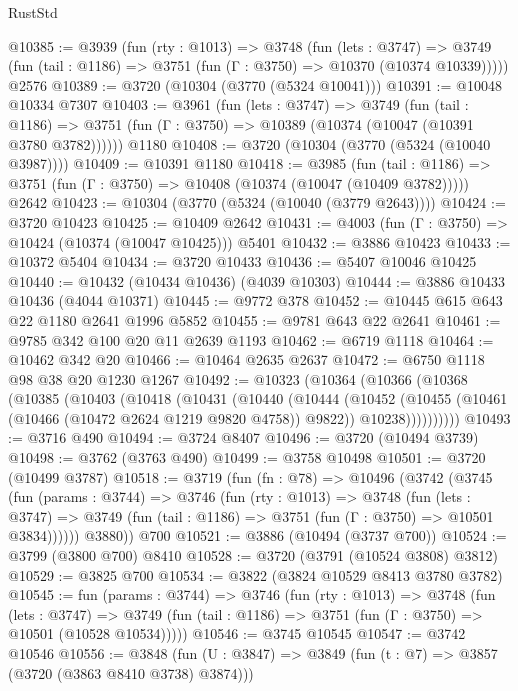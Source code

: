 \begin{lexlean}{RustStd}
\begin{coremodule}
@10385 := @3939
    (fun (rty : @1013) =>
    @3748
      (fun (lets : @3747) =>
      @3749 (fun (tail : @1186) => @3751 (fun (Γ : @3750) => @10370 (@10374 @10339)))))
    @2576
@10389 := @3720 (@10304 (@3770 (@5324 @10041)))
@10391 := @10048 @10334 @7307
@10403 := @3961
    (fun (lets : @3747) =>
    @3749
      (fun (tail : @1186) =>
      @3751 (fun (Γ : @3750) => @10389 (@10374 (@10047 (@10391 @3780 @3782))))))
    @1180
@10408 := @3720 (@10304 (@3770 (@5324 (@10040 @3987))))
@10409 := @10391 @1180
@10418 := @3985
    (fun (tail : @1186) => @3751 (fun (Γ : @3750) => @10408 (@10374 (@10047 (@10409 @3782)))))
    @2642
@10423 := @10304 (@3770 (@5324 (@10040 (@3779 @2643))))
@10424 := @3720 @10423
@10425 := @10409 @2642
@10431 := @4003 (fun (Γ : @3750) => @10424 (@10374 (@10047 @10425))) @5401
@10432 := @3886 @10423
@10433 := @10372 @5404
@10434 := @3720 @10433
@10436 := @5407 @10046 @10425
@10440 := @10432 (@10434 @10436) (@4039 @10303)
@10444 := @3886 @10433 @10436 (@4044 @10371)
@10445 := @9772 @378
@10452 := @10445 @615 @643 @22 @1180 @2641 @1996 @5852
@10455 := @9781 @643 @22 @2641
@10461 := @9785 @342 @100 @20 @11 @2639 @1193
@10462 := @6719 @1118
@10464 := @10462 @342 @20
@10466 := @10464 @2635 @2637
@10472 := @6750 @1118 @98 @38 @20 @1230 @1267
@10492 := @10323
    (@10364
      (@10366
        (@10368
          (@10385
            (@10403
              (@10418
                (@10431
                  (@10440
                    (@10444
                      (@10452
                        (@10455 (@10461 (@10466 (@10472 @2624 @1219 @9820 @4758)) @9822))
                        @10238))))))))))
@10493 := @3716 @490
@10494 := @3724 @8407
@10496 := @3720 (@10494 @3739)
@10498 := @3762 (@3763 @490)
@10499 := @3758 @10498
@10501 := @3720 (@10499 @3787)
@10518 := @3719
    (fun (fn : @78) =>
    @10496
      (@3742
        (@3745
          (fun (params : @3744) =>
          @3746
            (fun (rty : @1013) =>
            @3748
              (fun (lets : @3747) =>
              @3749 (fun (tail : @1186) => @3751 (fun (Γ : @3750) => @10501 @3834))))))
        @3880))
    @700
@10521 := @3886 (@10494 (@3737 @700))
@10524 := @3799 (@3800 @700) @8410
@10528 := @3720 (@3791 (@10524 @3808) @3812)
@10529 := @3825 @700
@10534 := @3822 (@3824 @10529 @8413 @3780 @3782)
@10545 := fun (params : @3744) =>
  @3746
    (fun (rty : @1013) =>
    @3748
      (fun (lets : @3747) =>
      @3749 (fun (tail : @1186) => @3751 (fun (Γ : @3750) => @10501 (@10528 @10534)))))
@10546 := @3745 @10545
@10547 := @3742 @10546
@10556 := @3848 (fun (U : @3847) => @3849 (fun (t : @7) => @3857 (@3720 (@3863 @8410 @3738) @3874)))

\end{coremodule}
\end{lexlean}
